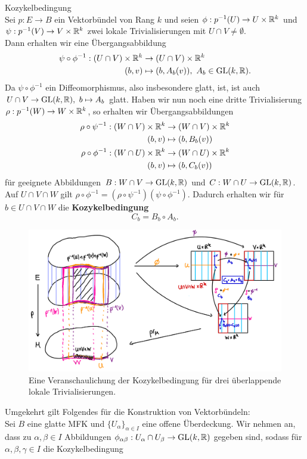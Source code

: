 \begin{bemerkung}Kozykelbedingung\\
Sei $p: E \to B$ ein Vektorbündel von Rang $k$ und seien $\phi: p^{-1}(U) \to U \times \mathbb{R}^k$ und $\psi: p^{-1}(V) \to V \times \mathbb{R}^k$ zwei lokale Trivialisierungen mit $U \cap V \neq \emptyset$.\\
Dann erhalten wir eine Übergangsabbildung
\begin{align}
\psi \circ \phi^{-1}: (U \cap V) \times \mathbb{R}^k &\to (U \cap V) \times \mathbb{R}^k \\
(b, v) &\mapsto (b, A_b(v)), \ A_b \in \text{GL}(k, \mathbb{R}).
\end{align}
Da $\psi \circ \phi^{-1}$ ein Diffeomorphismus, also insbesondere glatt, ist, ist auch $U \cap V \to \text{GL}(k, \mathbb{R}), \ b \mapsto A_b$ glatt. Haben wir nun noch eine dritte Trivialisierung $\rho: p^{-1} (W) \to W \times \mathbb{R}^k$, so erhalten wir Übergangsabbildungen
\begin{align}
\rho \circ \psi^{-1}: (W \cap V) \times \mathbb{R}^k &\to (W \cap V) \times \mathbb{R}^k \\
(b, v) &\mapsto (b, B_b(v)) \\
\rho \circ \phi^{-1}: (W \cap U) \times \mathbb{R}^k &\to (W \cap U) \times \mathbb{R}^k \\
(b, v) &\mapsto (b, C_b(v))
\end{align}
für geeignete Abbildungen $B: W \cap V \to \text{GL}(k, \mathbb{R})$ und $C: W \cap U \to \text{GL}(k, \mathbb{R})$. Auf $U \cap V \cap W$ gilt $\rho \circ \phi^{-1} = (\rho \circ \psi^{-1})(\psi \circ \phi^{-1})$. Dadurch erhalten wir für $b \in U \cap V \cap W$ die \textbf{Kozykelbedingung}
\begin{equation}
C_b = B_b \circ A_b.
\end{equation}
\begin{figure}[H]
\label{fig:vektorbuendel}
\centering
\includegraphics[width=0.5\linewidth]{Bilder/kozykel.png}
\caption{Eine Veranschaulichung der Kozykelbedingung für drei überlappende lokale Trivialisierungen.}
\end{figure}
Umgekehrt gilt Folgendes für die Konstruktion von Vektorbündeln:\\
Sei $B$ eine glatte MFK und $\{ U_\alpha \}_{\alpha  \in I}$ eine offene Überdeckung. Wir nehmen an, dass zu $\alpha, \beta \in I$ Abbildungen $\phi_{\alpha \beta}: U_\alpha \cap U_\beta \to \text{GL}(k, \mathbb{R})$ gegeben sind, sodass für $\alpha, \beta, \gamma \in I$ die Kozykelbedingung

\end{bemerkung}
